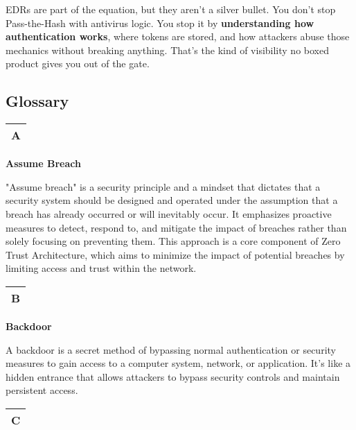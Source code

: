 EDRs are part of the equation, but they aren’t a silver bullet. You don’t stop Pass-the-Hash with antivirus logic. You stop it by \textbf{understanding how authentication works}, where tokens are stored, and how attackers abuse those mechanics without breaking anything. That’s the kind of visibility no boxed product gives you out of the gate.

\subsection{\textbf{Glossary}}

\begin{table}
\justifying

\begin{tabular}{l}
\textbf{A} \\
\hline

\end{tabular}

\end{table}

\textbf{Assume Breach}

"Assume breach" is a security principle and a mindset that dictates that a security system should be designed and operated under the assumption that a breach has already occurred or will inevitably occur. It emphasizes proactive measures to detect, respond to, and mitigate the impact of breaches rather than solely focusing on preventing them. This approach is a core component of Zero Trust Architecture, which aims to minimize the impact of potential breaches by limiting access and trust within the network.

\begin{table}
\justifying

\begin{tabular}{l}
\textbf{B} \\
\hline

\end{tabular}

\end{table}

\textbf{Backdoor}

A backdoor is a secret method of bypassing normal authentication or security measures to gain access to a computer system, network, or application. It's like a hidden entrance that allows attackers to bypass security controls and maintain persistent access.

\begin{table}
\justifying

\begin{tabular}{l}
\textbf{C} \\
\hline

\end{tabular}

\end{table}

